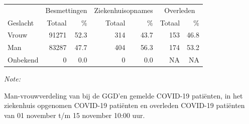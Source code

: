 \documentclass[
  english,
  man,floatsintext]{apa6}
\begin{document}
\begin{table}
\centering\begingroup\fontsize{11}{13}\selectfont

\begin{threeparttable}
\begin{tabular}{lrrrrrr}
\toprule
\multicolumn{1}{c}{ } & \multicolumn{2}{c}{Besmettingen} & \multicolumn{2}{c}{Ziekenhuisopnames} & \multicolumn{2}{c}{Overleden} \\
\cmidrule(l{3pt}r{3pt}){2-3} \cmidrule(l{3pt}r{3pt}){4-5} \cmidrule(l{3pt}r{3pt}){6-7}
Geslacht & Totaal & \% & Totaal & \% & Totaal & \%\\
\midrule
Vrouw & 91271 & 52.3 & 314 & 43.7 & 153 & 46.8\\
Man & 83287 & 47.7 & 404 & 56.3 & 174 & 53.2\\
Onbekend & 0 & 0.0 & 0 & 0.0 & NA & NA\\
\bottomrule
\end{tabular}
\begin{tablenotes}
\item \textit{Note: } 
\item Man-vrouwverdeling van bij de GGD’en gemelde COVID-19 patiënten, in het ziekenhuis opgenomen COVID-19 patiënten en overleden COVID-19 patiënten van 01 november t/m 15 november 10:00 uur.
\end{tablenotes}
\end{threeparttable}
\endgroup{}
\end{table}
\newpage
\end{document}
